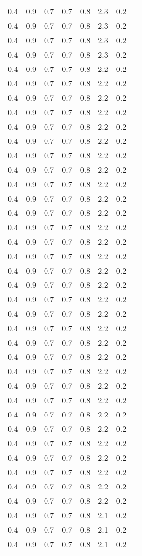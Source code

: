 \begin{tabular}{L{1in}|L{1in}|L{1in}|L{1in}|L{1in}|L{1in}|L{1in}|L{1in}}
0.4&0.9&0.7&0.7&0.8&2.3&0.2\\
0.4&0.9&0.7&0.7&0.8&2.3&0.2\\
0.4&0.9&0.7&0.7&0.8&2.3&0.2\\
0.4&0.9&0.7&0.7&0.8&2.3&0.2\\
0.4&0.9&0.7&0.7&0.8&2.2&0.2\\
0.4&0.9&0.7&0.7&0.8&2.2&0.2\\
0.4&0.9&0.7&0.7&0.8&2.2&0.2\\
0.4&0.9&0.7&0.7&0.8&2.2&0.2\\
0.4&0.9&0.7&0.7&0.8&2.2&0.2\\
0.4&0.9&0.7&0.7&0.8&2.2&0.2\\
0.4&0.9&0.7&0.7&0.8&2.2&0.2\\
0.4&0.9&0.7&0.7&0.8&2.2&0.2\\
0.4&0.9&0.7&0.7&0.8&2.2&0.2\\
0.4&0.9&0.7&0.7&0.8&2.2&0.2\\
0.4&0.9&0.7&0.7&0.8&2.2&0.2\\
0.4&0.9&0.7&0.7&0.8&2.2&0.2\\
0.4&0.9&0.7&0.7&0.8&2.2&0.2\\
0.4&0.9&0.7&0.7&0.8&2.2&0.2\\
0.4&0.9&0.7&0.7&0.8&2.2&0.2\\
0.4&0.9&0.7&0.7&0.8&2.2&0.2\\
0.4&0.9&0.7&0.7&0.8&2.2&0.2\\
0.4&0.9&0.7&0.7&0.8&2.2&0.2\\
0.4&0.9&0.7&0.7&0.8&2.2&0.2\\
0.4&0.9&0.7&0.7&0.8&2.2&0.2\\
0.4&0.9&0.7&0.7&0.8&2.2&0.2\\
0.4&0.9&0.7&0.7&0.8&2.2&0.2\\
0.4&0.9&0.7&0.7&0.8&2.2&0.2\\
0.4&0.9&0.7&0.7&0.8&2.2&0.2\\
0.4&0.9&0.7&0.7&0.8&2.2&0.2\\
0.4&0.9&0.7&0.7&0.8&2.2&0.2\\
0.4&0.9&0.7&0.7&0.8&2.2&0.2\\
0.4&0.9&0.7&0.7&0.8&2.2&0.2\\
0.4&0.9&0.7&0.7&0.8&2.2&0.2\\
0.4&0.9&0.7&0.7&0.8&2.2&0.2\\
0.4&0.9&0.7&0.7&0.8&2.2&0.2\\
0.4&0.9&0.7&0.7&0.8&2.1&0.2\\
0.4&0.9&0.7&0.7&0.8&2.1&0.2\\
0.4&0.9&0.7&0.7&0.8&2.1&0.2\\

\end{tabular}
